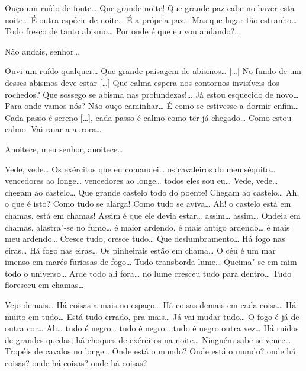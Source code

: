   Ouço um ruído de
fonte\ldots{} Que grande noite! Que grande paz cabe no haver esta noite\ldots{}
É outra espécie de noite\ldots{} É a própria paz\ldots{} Mas que lugar tão
estranho\ldots{} Todo fresco de tanto abismo\ldots{} Por onde é que eu vou
andando?\ldots{} 

 Não andais, senhor\ldots{}

 Ouvi um ruído qualquer\ldots{} Que grande paisagem de
abismos\ldots{} [\ldots{}] No fundo de um desses abismos deve estar [\ldots{}] Que
calma espera nos contornos invisíveis dos rochedos? Que sossego se
abisma nas profundezas!\ldots{} Já estou esquecido de novo\ldots{} Para onde
vamos nós? Não ouço caminhar\ldots{} É como se estivesse a dormir enfim\ldots{}
Cada passo é sereno [\ldots{}], cada passo é calmo como ter já chegado\ldots{}
Como estou calmo. Vai raiar a aurora\ldots{}\EP[1]

 Anoitece, meu senhor, anoitece\ldots{}

 Vede, vede\ldots{} Os exércitos que eu comandei\ldots{} os
cavaleiros do meu séquito\ldots{} vencedores ao longe\ldots{} vencedores ao
longe\ldots{} todos eles sou eu\ldots{} Vede, vede\ldots{} chegam ao castelo\ldots{} Que
grande castelo todo do poente! Chegam ao castelo\ldots{} Ah, o que é isto?
Como tudo se alarga! Como tudo se aviva\ldots{} Ah! o castelo está em
chamas, está em chamas! Assim é que ele devia estar\ldots{} assim\ldots{}
assim\ldots{} Ondeia em chamas, alastra"-se no fumo\ldots{} é maior ardendo, é
mais antigo ardendo\ldots{} é mais meu ardendo\ldots{} Cresce tudo, cresce
tudo\ldots{} Que deslumbramento\ldots{} Há fogo nas eiras\ldots{} Há fogo nas
eiras\ldots{} Os pinheirais estão em chama\ldots{} O céu é um mar imenso em
marés furiosas de fogo\ldots{} Tudo transborda lume\ldots{} Queima"-se em mim
todo o universo\ldots{} Arde todo ali fora… no lume cresceu tudo para
dentro\ldots{} Tudo floresceu em chamas\ldots{}

Vejo demais\ldots{} Há coisas a mais no espaço\ldots{} Há coisas demais em cada
coisa\ldots{} Há muito em tudo\ldots{} Está tudo errado, pra mais\ldots{} Já vai
mudar tudo\ldots{} O fogo é já de outra cor\ldots{} Ah\ldots{} tudo é negro\ldots{} tudo
é negro\ldots{} tudo é negro outra vez\ldots{} Há ruídos de grandes quedas; há
choques de exércitos na noite\ldots{} Ninguém sabe se vence\ldots{} Tropéis de
cavalos no longe\ldots{} Onde está o mundo? Onde está o mundo? onde há
coisas? onde há coisas? onde há coisas?\EP[1]


